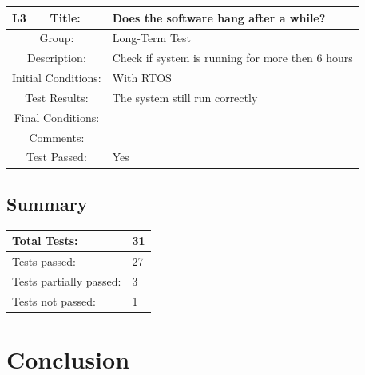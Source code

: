 \documentclass[12pt]{article}
\begin{document}
		\begin{table}[H]
	\begin{center}
		\begin{tabular}{| m{2cm}|m{2cm}|m{12cm}|}
			\hline 
			\bf L3&\bf Title:&\bf Does the software hang after a while?\\
			\hline 
			\multicolumn{2}{|c|}{Group:}&Long-Term Test\\ 
			\hline 
			\multicolumn{2}{|c|}{Description:}&Check if system is running for more then 6 hours\\ 
			\hline 
			\multicolumn{2}{|c|}{Initial Conditions:}&With RTOS\\ 
			\hline 
			\multicolumn{2}{|c|}{Test Results:}&The system still run correctly\\ 
			\hline 
			\multicolumn{2}{|c|}{Final Conditions:}&\\ 
			\hline 
			\multicolumn{2}{|c|}{Comments:}&\\ 
			\hline 
			\multicolumn{2}{|c|}{Test Passed:}&Yes \\ 
			\hline 
		\end{tabular} 
	\end{center}
\end{table}	

\subsection{Summary}

			\begin{table}[H]
		\begin{center}
			\begin{tabular}{| m{6cm}|m{2cm}|}
				\hline 
				\bf Total Tests:&\bf 31\\
				\hline 
				Tests passed:&27\\ 
				\hline 
				Tests partially passed:&3\\ 
				\hline 
				Tests not passed:&1\\ 
				\hline 
			\end{tabular} 
		\end{center}
	\end{table}	

	\section{Conclusion}
\end{document}
